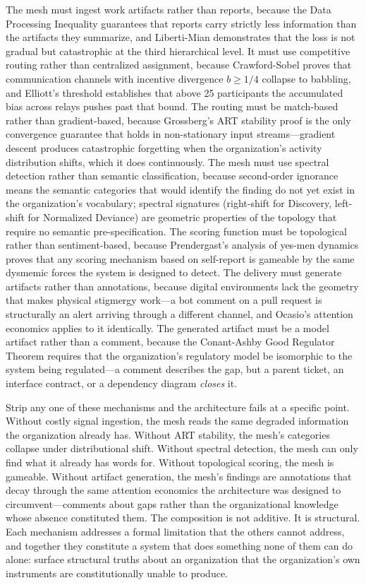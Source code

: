 \documentclass[11pt,a4paper]{article}
\begin{document}
The mesh must ingest work artifacts rather than reports, because the Data Processing Inequality guarantees that reports carry strictly less information than the artifacts they summarize, and Liberti-Mian demonstrates that the loss is not gradual but catastrophic at the third hierarchical level. It must use competitive routing rather than centralized assignment, because Crawford-Sobel proves that communication channels with incentive divergence $b \geq 1/4$ collapse to babbling, and Elliott's threshold establishes that above 25 participants the accumulated bias across relays pushes past that bound. The routing must be match-based rather than gradient-based, because Grossberg's ART stability proof is the only convergence guarantee that holds in non-stationary input streams---gradient descent produces catastrophic forgetting when the organization's activity distribution shifts, which it does continuously. The mesh must use spectral detection rather than semantic classification, because second-order ignorance means the semantic categories that would identify the finding do not yet exist in the organization's vocabulary; spectral signatures (right-shift for Discovery, left-shift for Normalized Deviance) are geometric properties of the topology that require no semantic pre-specification. The scoring function must be topological rather than sentiment-based, because Prendergast's analysis of yes-men dynamics proves that any scoring mechanism based on self-report is gameable by the same dysmemic forces the system is designed to detect. The delivery must generate artifacts rather than annotations, because digital environments lack the geometry that makes physical stigmergy work---a bot comment on a pull request is structurally an alert arriving through a different channel, and Ocasio's attention economics applies to it identically. The generated artifact must be a model artifact rather than a comment, because the Conant-Ashby Good Regulator Theorem requires that the organization's regulatory model be isomorphic to the system being regulated---a comment describes the gap, but a parent ticket, an interface contract, or a dependency diagram \emph{closes} it.

Strip any one of these mechanisms and the architecture fails at a specific point. Without costly signal ingestion, the mesh reads the same degraded information the organization already has. Without ART stability, the mesh's categories collapse under distributional shift. Without spectral detection, the mesh can only find what it already has words for. Without topological scoring, the mesh is gameable. Without artifact generation, the mesh's findings are annotations that decay through the same attention economics the architecture was designed to circumvent---comments about gaps rather than the organizational knowledge whose absence constituted them.  The composition is not additive. It is structural. Each mechanism addresses a formal limitation that the others cannot address, and together they constitute a system that does something none of them can do alone: surface structural truths about an organization that the organization's own instruments are constitutionally unable to produce.
\end{document}
